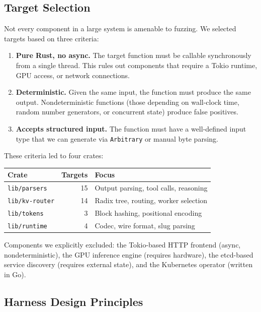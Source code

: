 \subsection{Target Selection}

Not every component in a large system is amenable to fuzzing. We selected targets based on three criteria:

\begin{enumerate}
  \item \textbf{Pure Rust, no async.} The target function must be callable synchronously from a single thread. This rules out components that require a Tokio runtime, GPU access, or network connections.
  \item \textbf{Deterministic.} Given the same input, the function must produce the same output. Nondeterministic functions (those depending on wall-clock time, random number generators, or concurrent state) produce false positives.
  \item \textbf{Accepts structured input.} The function must have a well-defined input type that we can generate via \texttt{Arbitrary} or manual byte parsing.
\end{enumerate}

These criteria led to four crates:

\begin{center}
\begin{tabular}{lrl}
\toprule
\textbf{Crate} & \textbf{Targets} & \textbf{Focus} \\
\midrule
\texttt{lib/parsers} & 15 & Output parsing, tool calls, reasoning \\
\texttt{lib/kv-router} & 14 & Radix tree, routing, worker selection \\
\texttt{lib/tokens} & 3 & Block hashing, positional encoding \\
\texttt{lib/runtime} & 4 & Codec, wire format, slug parsing \\
\bottomrule
\end{tabular}
\end{center}

Components we explicitly excluded: the Tokio-based HTTP frontend (async, nondeterministic), the GPU inference engine (requires hardware), the etcd-based service discovery (requires external state), and the Kubernetes operator (written in Go).

\subsection{Harness Design Principles}

